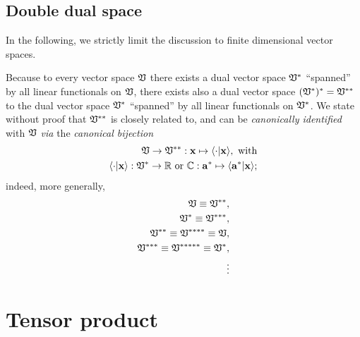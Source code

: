 \subsection{Double dual space}
\label{2012-m-dds}

In the following, we strictly limit the discussion to finite dimensional vector spaces.

Because to every vector  space ${\frak V}$
there exists a dual vector  space ${\frak V}^\ast$ ``spanned'' by all linear functionals on ${\frak V}$,
there exists also a dual vector space $({\frak V}^{\ast})^{\ast}={\frak V}^{\ast \ast}$ to the dual  vector  space ${\frak V}^\ast$
 ``spanned'' by all linear functionals on ${\frak V}^\ast$.
We state without proof
that ${\frak V}^{\ast \ast}$ is closely related to, and can be {\em canonically identified} with ${\frak V}$
{\em via} the {\em canonical bijection}
\begin{equation}
\begin{split}
{\frak V}  \rightarrow {\frak V}^{\ast \ast }: {\bf x}  \mapsto \langle \cdot  \vert {\bf x}\rangle ,
\textrm{ with} \\
\langle \cdot  \vert {\bf x}\rangle : {\frak V}^\ast \rightarrow {\Bbb R}
\textrm{ or }
{\Bbb C} : {\bf a}^\ast  \mapsto \langle {\bf a}^\ast   \vert {\bf x}\rangle
;
\end{split}
\end{equation}
indeed, more generally,
\begin{equation}
\begin{split}
{\frak V}\equiv {\frak V}^{\ast \ast},\\
{\frak V}^\ast \equiv {\frak V}^{\ast \ast \ast},\\
{\frak V}^{\ast \ast} \equiv {\frak V}^{\ast \ast \ast \ast}\equiv {\frak V},\\
{\frak V}^{\ast  \ast \ast} \equiv {\frak V}^{\ast \ast \ast  \ast \ast}\equiv {\frak V}^\ast ,\\
\qquad \vdots
\end{split}
\end{equation}



\section{Tensor product}
\label{2011-m-tensorp}



